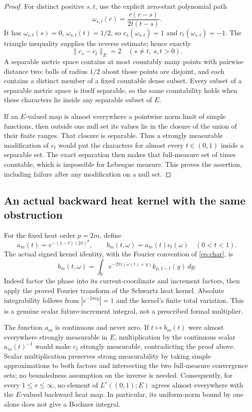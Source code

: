 \documentclass[11pt]{article}
\theoremstyle{remark}\newtheorem{remark}[theorem]{Remark}
\newcommand{\R}{\mathbb R}\newcommand{\C}{\mathbb C}
\begin{document}
\begin{proof}
For distinct positive $s,t$, use the explicit zero-start polynomial
path
\[
 \omega_{s,t}(r)=\frac{r(r-s)}{2t(t-s)}.
\]
It has $\omega_{s,t}(s)=0$, $\omega_{s,t}(t)=1/2$, so
$c_s(\omega_{s,t})=1$ and $c_t(\omega_{s,t})=-1$. The triangle
inequality supplies the reverse estimate; hence exactly
\[
 \|c_s-c_t\|_E=2\quad(s\ne t,\ s,t>0).
\]
A separable metric space contains at most countably many points
with pairwise distance two: balls of radius $1/2$ about those points
are disjoint, and each contains a distinct member of a fixed countable
dense subset. Every subset of a separable metric space is itself
separable, so the same countability holds when these characters lie
inside any separable subset of $E$.

If an $E$-valued map is almost everywhere a pointwise norm limit of
simple functions, then outside one null set its values lie in the
closure of the union of their finite ranges. That closure is separable.
Thus a strongly measurable modification of $c_t$ would put the
characters for almost every $t\in(0,1)$ inside a separable set.
The exact separation then makes that full-measure set of times
countable, which is impossible for Lebesgue measure. This proves the
assertion, including failure after any modification on a null set.
\end{proof}

\subsection*{An actual backward heat kernel with the same obstruction}
For the fixed heat order $p=2m$, define
\[
 a_m(t)=e^{-(1-t)(2\pi)^p},\qquad
 b_m(t,\omega)=a_m(t)c_t(\omega)\quad(0<t<1).
\]
The actual signed kernel identity, with the Fourier convention of
\eqref{eq:char}, is
\[
 b_m(t,\omega)=\int_\R e^{-2\pi i(\omega(t)+y)}k_{p,1-t}(y)\,dy.
\]
Indeed factor the phase into its current-coordinate and increment
factors, then apply the proved Fourier transform of the Schwartz
heat kernel. Absolute integrability follows from $|e^{-2\pi iy}|=1$
and the kernel's finite total variation. This is a genuine scalar
future-increment integral, not a prescribed formal multiplier.

The function $a_m$ is continuous and never zero. If $t\mapsto b_m(t)$
were almost everywhere strongly measurable in $E$, multiplication
by the continuous scalar $a_m(t)^{-1}$ would make $c_t$ strongly
measurable, contradicting the proof above. Scalar multiplication
preserves strong measurability by taking simple approximations to
both factors and intersecting the two full-measure convergence sets;
no boundedness assumption on the inverse is needed. Consequently,
for every $1\le r\le\infty$, no element of $L^r((0,1);E)$ agrees
almost everywhere with the $E$-valued backward heat map. In particular,
its uniform-norm bound by one alone does not give a Bochner integral.
\end{document}

